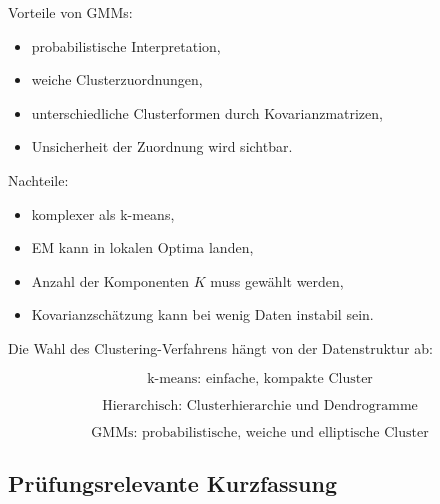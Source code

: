 \documentclass[11pt,a4paper]{scrartcl}
\begin{document}
\begin{solutionbox}
    Vorteile von GMMs:

    \begin{itemize}
        \item probabilistische Interpretation,
        \item weiche Clusterzuordnungen,
        \item unterschiedliche Clusterformen durch Kovarianzmatrizen,
        \item Unsicherheit der Zuordnung wird sichtbar.
    \end{itemize}

    Nachteile:

    \begin{itemize}
        \item komplexer als k-means,
        \item EM kann in lokalen Optima landen,
        \item Anzahl der Komponenten \(K\) muss gewählt werden,
        \item Kovarianzschätzung kann bei wenig Daten instabil sein.
    \end{itemize}
\end{solutionbox}

\begin{answerbox}
    Die Wahl des Clustering-Verfahrens hängt von der Datenstruktur ab:

    \[
        \boxed{
            \text{k-means: einfache, kompakte Cluster}
        }
    \]

    \[
        \boxed{
            \text{Hierarchisch: Clusterhierarchie und Dendrogramme}
        }
    \]

    \[
        \boxed{
            \text{GMMs: probabilistische, weiche und elliptische Cluster}
        }
    \]
\end{answerbox}

\subsection{Prüfungsrelevante Kurzfassung}
\end{document}
